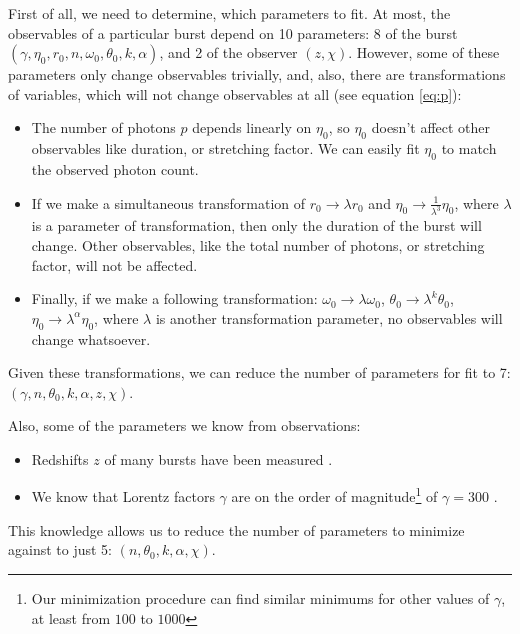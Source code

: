 \documentclass{article}
\begin{document}
First of all, we need to determine, which parameters to fit. At most, the observables of a particular burst depend on 10 parameters: 8 of the burst $\left(\gamma, \eta_0, r_0, n, \omega_0, \theta_0, k, \alpha\right)$, and 2 of the observer $\left(z, \chi\right)$. However, some of these parameters only change observables trivially, and, also, there are transformations of variables, which will not change observables at all (see equation \ref{eq:p}):
\begin{itemize}
	\item{The number of photons $p$ depends linearly on $\eta_0$, so $\eta_0$ doesn't affect other observables like duration, or stretching factor. We can easily fit $\eta_0$ to match the observed photon count.}
	\item{If we make a simultaneous transformation of $r_0 \rightarrow \lambda r_0$ and $\eta_0 \rightarrow \frac{1}{\lambda^3}\eta_0$, where $\lambda$ is a parameter of transformation, then only the duration of the burst will change. Other observables, like the total number of photons, or stretching factor, will not be affected.}
	\item{Finally, if we make a following transformation: $\omega_0 \rightarrow \lambda \omega_0$, $\theta_0 \rightarrow \lambda^k \theta_0$, $\eta_0 \rightarrow \lambda^\alpha \eta_0$, where $\lambda$ is another transformation parameter, no observables will change whatsoever.}
\end{itemize}
Given these transformations, we can reduce the number of parameters for fit to 7: $\left(\gamma, n, \theta_0, k, \alpha, z, \chi\right)$.

Also, some of the parameters we know from observations:
\begin{itemize}
	\item{Redshifts $z$ of many bursts have been measured \cite{Ackermann:2013zfa}.}
	\item{We know that Lorentz factors $\gamma$ are on the order of magnitude\footnote{Our minimization procedure can find similar minimums for other values of $\gamma$, at least from $100$ to $1000$} of $\gamma = 300$ \cite{Ghirlanda:2011ux}.}
\end{itemize}
This knowledge allows us to reduce the number of parameters to minimize against to just 5: $\left(n, \theta_0, k, \alpha, \chi\right)$.
\end{document}
